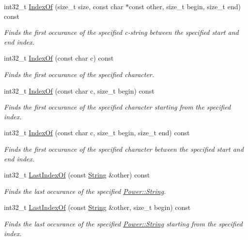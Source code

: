 \begin{DoxyCompactItemize}
int32\+\_\+t \hyperlink{class_power_1_1_string_af3cbc9784bdb9945515b85661901697c}{Index\+Of} (size\+\_\+t size, const char $\ast$const other, size\+\_\+t begin, size\+\_\+t end) const
\begin{DoxyCompactList}\small\item\em Finds the first occurance of the specified c-\/string between the specified start and end index. \end{DoxyCompactList}\item 
int32\+\_\+t \hyperlink{class_power_1_1_string_a3950fad3517697abedcda15b4d310e14}{Index\+Of} (const char c) const
\begin{DoxyCompactList}\small\item\em Finds the first occurance of the specified character. \end{DoxyCompactList}\item 
int32\+\_\+t \hyperlink{class_power_1_1_string_a6aafcf929eeb35e0ca006bf49e8dd44b}{Index\+Of} (const char c, size\+\_\+t begin) const
\begin{DoxyCompactList}\small\item\em Finds the first occurance of the specified character starting from the specified index. \end{DoxyCompactList}\item 
int32\+\_\+t \hyperlink{class_power_1_1_string_ab83cb9bbbc8e0b7104568f7767527515}{Index\+Of} (const char c, size\+\_\+t begin, size\+\_\+t end) const
\begin{DoxyCompactList}\small\item\em Finds the first occurance of the specified character between the specified start and end index. \end{DoxyCompactList}\item 
int32\+\_\+t \hyperlink{class_power_1_1_string_ab92f573b751cdc645513a49d4bfc442d}{Last\+Index\+Of} (const \hyperlink{class_power_1_1_string}{String} \&other) const
\begin{DoxyCompactList}\small\item\em Finds the last occurance of the specified \hyperlink{class_power_1_1_string}{Power\+::\+String}. \end{DoxyCompactList}\item 
int32\+\_\+t \hyperlink{class_power_1_1_string_a3c804a2022f2260cde65ad9880a7b3e9}{Last\+Index\+Of} (const \hyperlink{class_power_1_1_string}{String} \&other, size\+\_\+t begin) const
\begin{DoxyCompactList}\small\item\em Finds the last occurance of the specified \hyperlink{class_power_1_1_string}{Power\+::\+String} starting from the specified index. \end{DoxyCompactList}\item 

\end{DoxyCompactItemize}
